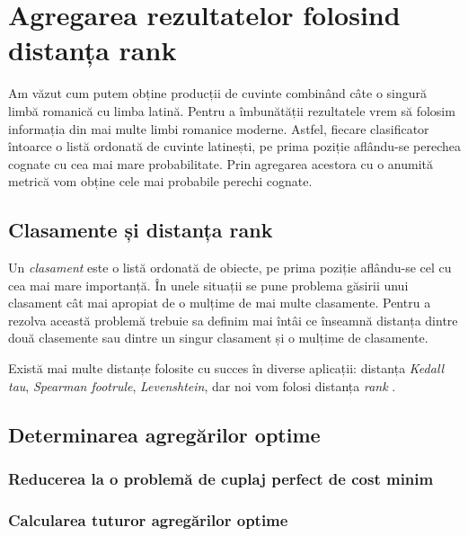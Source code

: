 \chapter{Agregarea rezultatelor folosind distanța rank}
Am văzut cum putem obține producții de cuvinte combinând câte o singură limbă romanică cu 
limba latină. Pentru a îmbunătății rezultatele vrem să folosim informația din mai multe 
limbi romanice moderne. Astfel, fiecare clasificator întoarce o listă ordonată de cuvinte latinești, 
pe prima poziție aflându-se perechea cognate cu cea mai mare probabilitate. Prin agregarea 
acestora cu o anumită metrică vom obține cele mai probabile perechi cognate.

\section{Clasamente și distanța rank}
Un \textit{clasament} este o listă ordonată de obiecte, pe prima poziție aflându-se cel cu cea mai
mare importanță. În unele situații se pune problema găsirii unui clasament cât mai apropiat de o
mulțime de mai multe clasamente. Pentru a rezolva această problemă trebuie sa definim mai întâi ce
înseamnă distanța dintre două clasemente sau dintre un singur clasament și o mulțime de clasamente.

Există mai multe distanțe folosite cu succes în diverse aplicații: distanța \textit{Kedall tau}, 
\textit{Spearman footrule}, \textit{Levenshtein}, dar noi vom folosi distanța \textit{rank}
\cite{rankdistance}.

\section{Determinarea agregărilor optime}
\subsection{Reducerea la o problemă de cuplaj perfect de cost minim}
\subsection{Calcularea tuturor agregărilor optime}
